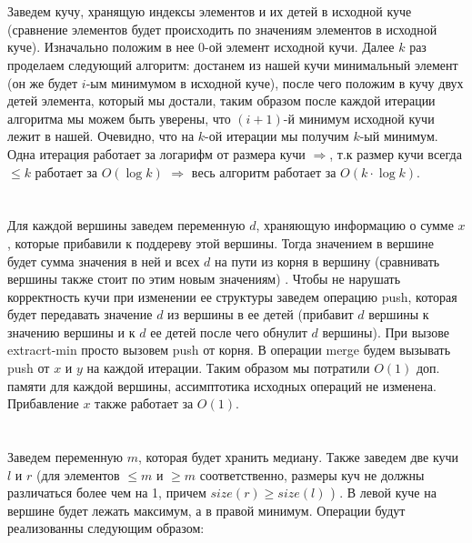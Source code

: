 \documentclass{article}
\begin{document}
\begin{flushleft}
\section{}

Заведем кучу, хранящую индексы элементов и их детей в исходной куче  (сравнение элементов будет происходить по значениям элементов в исходной куче). Изначально положим в нее 0-ой элемент исходной кучи. Далее $k$ раз проделаем следующий алгоритм: достанем из нашей кучи минимальный элемент (он же будет $i$-ым минимумом в исходной куче), после чего положим в кучу двух детей элемента, который мы достали, таким образом после каждой итерации алгоритма мы можем быть уверены, что $(i + 1)$-й минимум исходной кучи лежит в нашей. Очевидно, что на $k$-ой итерации мы получим $k$-ый минимум. Одна итерация работает за логарифм от размера кучи $\Rightarrow$, т.к размер кучи всегда $\le k$ работает за $O(\log{k})$ $\Rightarrow$ весь алгоритм работает за $O(k \cdot \log{k})$.

\section{}

Для каждой вершины заведем переменную $d$, храняющую информацию о сумме $x$, которые прибавили к поддереву этой вершины. Тогда значением в вершине будет сумма значения в ней и всех $d$ на пути из корня в вершину (сравнивать вершины также стоит по этим новым значениям) . Чтобы не нарушать корректность кучи при изменении ее структуры заведем операцию push, которая будет передавать значение $d$ из вершины в ее детей (прибавит $d$ вершины к значению вершины и к $d$ ее детей после чего обнулит $d$ вершины). При вызове extracrt-min просто вызовем push от корня. В операции merge будем вызывать push от $x$ и $y$ на каждой итерации. Таким образом мы потратили $O(1)$ доп. памяти для каждой вершины, ассимптотика исходных операций не изменена. Прибавление $x$ также работает за $O(1)$.

\section{}

Заведем переменную $m$, которая будет хранить медиану. Также заведем две кучи $l$ и $r$ (для элементов $\le m$ и $\ge m$ соответственно, размеры куч не должны различаться более чем на 1, причем $size(r) \ge size(l)$ ) . В левой куче на вершине будет лежать максимум, а в правой минимум. Операции будут реализованны следующим образом:


\end{flushleft}
\end{document}
